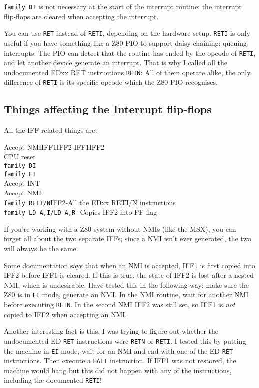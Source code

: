 \documentclass[twoside,openright,a4paper]{book}
\begin{document}
{\tt family DI} is not necessary at the start of the interrupt routine: the interrupt flip-flops are cleared when accepting the interrupt.

You can use {\tt RET} instead of {\tt RETI}, depending on the hardware setup. {\tt RETI} is only useful if you have something like a Z80 PIO to support daisy-chaining: queuing interrupts. The PIO can detect that the routine has ended by the opcode of {\tt RETI}, and let another device generate an interrupt. That is why I called all the undocumented EDxx RET instructions {\tt RETN}: All of them operate alike, the only difference of {\tt RETI} is its specific opcode which the Z80 PIO recognises.


\subsection{Things affecting the Interrupt flip-flops}
\label{flipflop}

All the IFF related things are:

\begin{tabbing}
	Accept NMI{\qquad}\=IFF1{\qquad}\=IFF2{\qquad}\= \kill
	\>IFF1\>IFF2\>\\
	CPU reset\>0\\
	{\tt family DI}\>0\\
	{\tt family EI}\>1\\
	Accept INT\>0\\
	Accept NMI\>-\\
	{\tt family RETI/N}\>IFF2\>-\>All the EDxx RETI/N instructions\\
	{\tt family LD A,I/LD A,R}\>-\>-\>Copies IFF2 into PF flag
\end{tabbing}

If you're working with a Z80 system without NMIs (like the MSX), you can forget all about the two separate IFFs; since a NMI isn't ever generated, the two will always be the same. 

Some documentation says that when an NMI is accepted, IFF1 is first copied into IFF2 before IFF1 is cleared. If this is true, the state of IFF2 is lost after a nested NMI, which is undesirable. Have tested this in the following way: make sure the Z80 is in {\tt EI} mode, generate an NMI. In the NMI routine, wait for another NMI before executing {\tt RETN}. In the second NMI IFF2 was still set, so IFF1 is {\em not} copied to IFF2 when accepting an NMI.

Another interesting fact is this. I was trying to figure out whether the undocumented ED {\tt RET} instructions were {\tt RETN} or {\tt RETI}. I tested this by putting the machine in {\tt EI} mode, wait for an NMI and end with one of the ED {\tt RET} instructions. Then execute a {\tt HALT} instruction. If IFF1 was not restored, the machine would hang but this did not happen with any of the instructions, including the documented {\tt RETI}!
\end{document}
